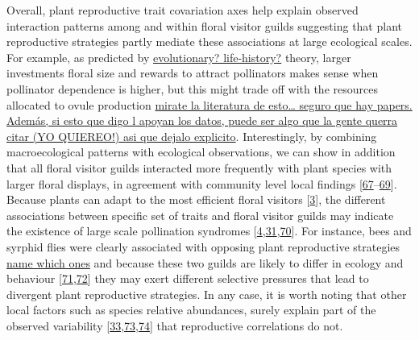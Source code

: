 \documentclass[
  12pt,
  a4paper,
]{article}
\begin{document}
Overall, plant reproductive trait covariation axes help explain observed interaction patterns among and within floral visitor guilds suggesting that plant reproductive strategies partly mediate these associations at large ecological scales. For example, as predicted by \href{}{evolutionary? life-history?} theory, larger investments floral size and rewards to attract pollinators makes sense when pollinator dependence is higher, but this might trade off with the resources allocated to ovule production \href{Anne\%20Leonard\%20tenia\%20algo\%20de\%20eso,\%20creo}{mirate la literatura de esto\ldots{} seguro que hay papers. Además, si esto que digo l apoyan los datos, puede ser algo que la gente querra citar (YO QUIEREO!) asi que dejalo explicito}. Interestingly, by combining macroecological patterns with ecological observations, we can show in addition that all floral visitor guilds interacted more frequently with plant species with larger floral displays, in agreement with community level local findings {[}\protect\hyperlink{ref-hegland2005}{67}--\protect\hyperlink{ref-kaiser2014}{69}{]}. Because plants can adapt to the most efficient floral visitors {[}\protect\hyperlink{ref-fenster2004}{3}{]}, the different associations between specific set of traits and floral visitor guilds may indicate the existence of large scale pollination syndromes {[}\protect\hyperlink{ref-dellinger2020}{4},\protect\hyperlink{ref-rosas2014}{31},\protect\hyperlink{ref-faegri2013}{70}{]}. For instance, bees and syrphid flies were clearly associated with opposing plant reproductive strategies \href{}{name which ones} and because these two guilds are likely to differ in ecology and behaviour {[}\protect\hyperlink{ref-rader2020}{71},\protect\hyperlink{ref-foldesi2021}{72}{]} they may exert different selective pressures that lead to divergent plant reproductive strategies. In any case, it is worth noting that other local factors such as species relative abundances, surely explain part of the observed variability {[}\protect\hyperlink{ref-bartomeus2016}{33},\protect\hyperlink{ref-vazquez2007}{73},\protect\hyperlink{ref-encinas2012}{74}{]} that reproductive correlations do not.
\end{document}
